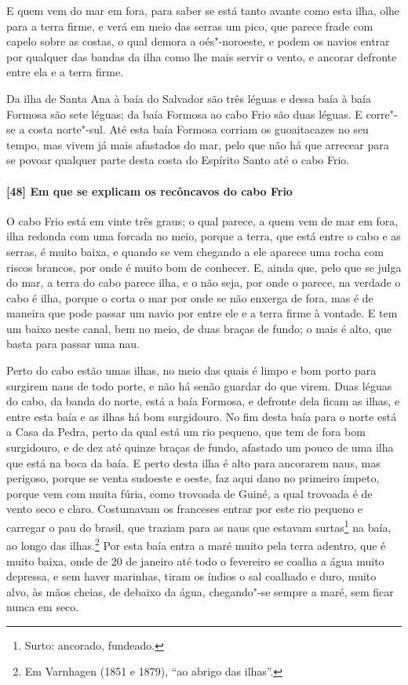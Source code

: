 \begin{linenumbers}
E quem vem do mar em fora, para saber se está tanto avante como esta ilha, olhe para a
terra firme, e verá em meio das serras um pico, que parece frade com capelo sobre as
costas, o qual demora a oés"-noroeste, e podem os navios entrar por qualquer das bandas da
ilha como lhe mais servir o vento, e ancorar defronte entre ela e a terra firme.

Da ilha de Santa Ana à baía do Salvador são três léguas e dessa baía à baía Formosa são
sete léguas; da baía Formosa ao cabo Frio são duas léguas. E corre"-se a costa norte"-sul.
Até esta baía Formosa corriam os guoaitacazes no seu tempo, mas vivem já mais afastados do
mar, pelo que não há que arrecear para se povoar qualquer parte desta costa do Espírito
Santo até o cabo Frio.

\paragraph{[48] Em que se explicam os recôncavos do cabo Frio} \quad
O cabo Frio está em vinte três graus; o qual parece, a quem vem de mar em fora, ilha
redonda com uma forcada no meio, porque a terra, que está entre o cabo e as serras, é
muito baixa, e quando se vem chegando a ele aparece uma rocha com riscos brancos, por onde
é muito bom de conhecer. E, ainda que, pelo que se julga do mar, a terra do cabo parece
ilha, e o não seja, por onde o parece, na verdade o cabo é ilha, porque o corta o mar por
onde se não enxerga de fora, mas é de maneira que pode passar um navio por entre ele e a
terra firme à vontade. E tem um baixo neste canal, bem no meio, de duas braças de fundo; o
mais é alto, que basta para passar uma nau.

Perto do cabo estão umas ilhas, no meio das quais é limpo e bom porto para surgirem naus
de todo porte, e não há senão guardar do que virem. Duas léguas do cabo, da banda do
norte, está a baía Formosa, e defronte dela ficam as ilhas, e entre esta baía e as ilhas
há bom surgidouro. No fim desta baía para o norte está a Casa da Pedra, perto da qual está
um rio pequeno, que tem de fora bom surgidouro, e de dez até quinze braças de fundo,
afastado um pouco de uma ilha que está na boca da baía. E perto desta ilha é alto para
ancorarem naus, mas perigoso, porque se venta sudoeste e oeste, faz aqui dano no primeiro
ímpeto, porque vem com muita fúria, como trovoada de Guiné, a qual trovoada é de vento
seco e claro. Costumavam os franceses entrar por este rio pequeno e carregar o pau do
brasil, que traziam para as naus que estavam surtas\footnote{ Surto: ancorado, fundeado.}
na baía, ao longo das ilhas.\footnote{ Em Varnhagen (1851 e 1879), ``ao abrigo das
ilhas''.} Por esta baía entra a maré muito pela terra adentro, que é muito baixa, onde de
20 de janeiro até todo o fevereiro se coalha a água muito depressa, e sem haver marinhas,
tiram os índios o sal coalhado e duro, muito alvo, às mãos cheias, de debaixo da água,
chegando"-se sempre a maré, sem ficar nunca em seco.


\end{linenumbers}
